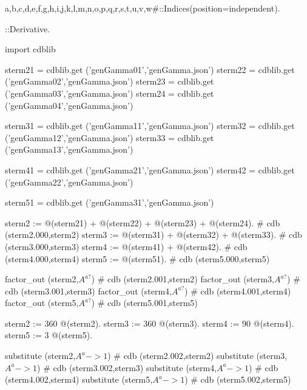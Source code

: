 \documentclass[12pt]{cdblatex}
\begin{document}
\begin{cadabra}
   {a,b,c,d,e,f,g,h,i,j,k,l,m,n,o,p,q,r,s,t,u,v,w#}::Indices(position=independent).

   \nabla{#}::Derivative.

   import cdblib

   sterm21 = cdblib.get ('genGamma01','genGamma.json')
   sterm22 = cdblib.get ('genGamma02','genGamma.json')
   sterm23 = cdblib.get ('genGamma03','genGamma.json')
   sterm24 = cdblib.get ('genGamma04','genGamma.json')

   sterm31 = cdblib.get ('genGamma11','genGamma.json')
   sterm32 = cdblib.get ('genGamma12','genGamma.json')
   sterm33 = cdblib.get ('genGamma13','genGamma.json')

   sterm41 = cdblib.get ('genGamma21','genGamma.json')
   sterm42 = cdblib.get ('genGamma22','genGamma.json')

   sterm51 = cdblib.get ('genGamma31','genGamma.json')

   sterm2 := @(sterm21) + @(sterm22) + @(sterm23) + @(sterm24).  # cdb (sterm2.000,sterm2)
   sterm3 := @(sterm31) + @(sterm32) + @(sterm33).               # cdb (sterm3.000,sterm3)
   sterm4 := @(sterm41) + @(sterm42).                            # cdb (sterm4.000,sterm4)
   sterm5 := @(sterm51).                                         # cdb (sterm5.000,sterm5)

   factor_out (sterm2,$A^{a?}$)                                  # cdb (sterm2.001,sterm2)
   factor_out (sterm3,$A^{a?}$)                                  # cdb (sterm3.001,sterm3)
   factor_out (sterm4,$A^{a?}$)                                  # cdb (sterm4.001,sterm4)
   factor_out (sterm5,$A^{a?}$)                                  # cdb (sterm5.001,sterm5)

   sterm2 := 360 @(sterm2).
   sterm3 := 360 @(sterm3).
   sterm4 :=  90 @(sterm4).
   sterm5 :=   3 @(sterm5).

   substitute (sterm2,$A^{a}->1$)                                # cdb (sterm2.002,sterm2)
   substitute (sterm3,$A^{a}->1$)                                # cdb (sterm3.002,sterm3)
   substitute (sterm4,$A^{a}->1$)                                # cdb (sterm4.002,sterm4)
   substitute (sterm5,$A^{a}->1$)                                # cdb (sterm5.002,sterm5)

\end{cadabra}

\end{document}
